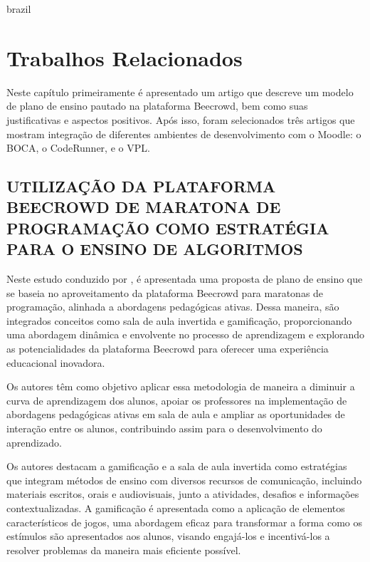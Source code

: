 

\begin{otherlanguage*}{brazil}

    \chapter{Trabalhos Relacionados}

    Neste capítulo primeiramente é apresentado um artigo que descreve um modelo de plano de ensino pautado na plataforma Beecrowd, bem como suas justificativas e aspectos positivos. Após isso, foram selecionados três artigos que mostram integração de diferentes ambientes de desenvolvimento com o Moodle: o BOCA, o CodeRunner, e o VPL.


\section{UTILIZAÇÃO DA PLATAFORMA BEECROWD DE MARATONA DE PROGRAMAÇÃO COMO ESTRATÉGIA PARA O ENSINO DE ALGORITMOS}

Neste estudo conduzido por \cite{cruz2022}, é apresentada uma proposta de plano de ensino que se baseia no aproveitamento da plataforma Beecrowd para maratonas de programação, alinhada a abordagens pedagógicas ativas. Dessa maneira, são integrados conceitos como sala de aula invertida e gamificação, proporcionando uma abordagem dinâmica e envolvente no processo de aprendizagem e explorando as potencialidades da plataforma Beecrowd para oferecer uma experiência educacional inovadora. 

Os autores têm como objetivo aplicar essa metodologia de maneira a diminuir a curva de aprendizagem dos alunos, apoiar os professores na implementação de abordagens pedagógicas ativas em sala de aula e ampliar as oportunidades de interação entre os alunos, contribuindo assim para o desenvolvimento do aprendizado.

Os autores destacam a gamificação e a sala de aula invertida como estratégias que integram métodos de ensino com diversos recursos de comunicação, incluindo materiais escritos, orais e audiovisuais, junto a atividades, desafios e informações contextualizadas. A gamificação é apresentada como a aplicação de elementos característicos de jogos, uma abordagem eficaz para transformar a forma como os estímulos são apresentados aos alunos, visando engajá-los e incentivá-los a resolver problemas da maneira mais eficiente possível. 


\end{otherlanguage*}
